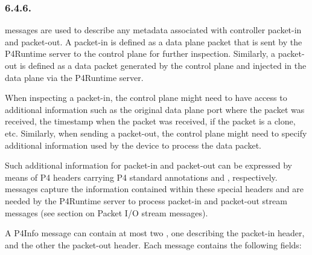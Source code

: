 \documentclass[11pt]{article}
\begin{document}
{%
\subsubsection{6.4.6.\hspace*{0.5em}}\label{sec-controller-packet-meta}%

\noindent{} messages are used to describe any metadata associated
with controller packet-in and packet-out. A packet-in is defined as a data plane
packet that is sent by the P4Runtime server to the control plane for further
inspection. Similarly, a packet-out is defined as a data packet generated by the
control plane and injected in the data plane via the P4Runtime server.%

When inspecting a packet-in, the control plane might need to have access to
additional information such as the original data plane port where the packet was
received, the timestamp when the packet was received, if the packet is a clone,
etc. Similarly, when sending a packet-out, the control plane might need to
specify additional information used by the device to process the data packet.%

Such additional information for packet-in and packet-out can be expressed by
means of P4 headers carrying P4 standard annotations
 and ,
respectively.  messages capture the information
contained within these special headers and are needed by the P4Runtime server to
process packet-in and packet-out stream messages (see section on Packet I/O
stream messages).%

A P4Info message can contain at most two ,
one describing the packet-in header, and the other the packet-out header. Each
message contains the following fields:%

}
\end{document}
